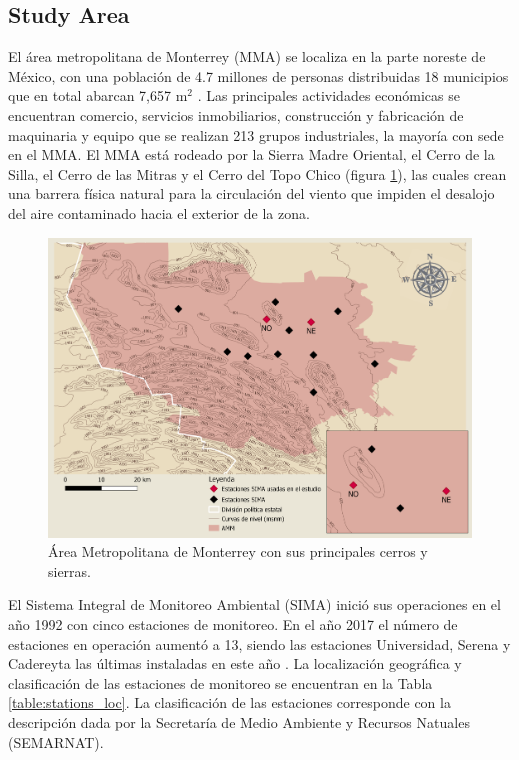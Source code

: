 \subsection{Study Area}
El área metropolitana de Monterrey (MMA) se localiza en la parte noreste de México, con una población de 4.7 millones de personas distribuidas 18 municipios que en total abarcan 7,657 m$^2$ \cite{inegi2015}. Las principales actividades económicas se encuentran comercio, servicios inmobiliarios, construcción y fabricación de maquinaria y equipo que se realizan 213 grupos industriales, la mayoría con sede en el MMA. El MMA está rodeado por la Sierra Madre Oriental, el Cerro de la Silla, el Cerro de las Mitras y el Cerro del Topo Chico (figura \ref{fig:map}), las cuales crean una barrera física natural para la circulación del viento que impiden el desalojo del aire contaminado hacia el exterior de la zona.\cite{proaire2008}
\begin{figure}[H]
    \centering
    \includegraphics[scale=0.2]{images/map.png}
    \caption{Área Metropolitana de Monterrey con sus principales cerros y sierras.}
    \label{fig:map}
\end{figure}
El Sistema Integral de Monitoreo Ambiental (SIMA) inició sus operaciones en el año 1992 con cinco estaciones de monitoreo. En el año 2017 el número de estaciones en operación aumentó a 13, siendo las estaciones Universidad, Serena y Cadereyta las últimas instaladas en este año \cite{simapage}. La localización geográfica y clasificación de las estaciones de monitoreo se encuentran en la Tabla \ref{table:stations_loc}. La clasificación de las estaciones corresponde con la descripción dada por la Secretaría de Medio Ambiente y Recursos Natuales (SEMARNAT). \cite{proaire2016}

